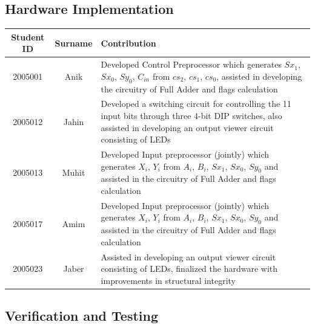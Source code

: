 \documentclass{article}
\begin{document}
\newpage

\subsection{Hardware Implementation}



\begin{table}[h]
    \centering
\begin{tabular}{|c|c|p{10cm}|}
\hline
Student ID & Surname & Contribution \\ \hline
2005001    & Anik    & Developed Control Preprocessor which generates $Sx_1$, $Sx_0$, $Sy_0$, $C_{in}$ from $cs_2$, $cs_1$, $cs_0$, assisted in developing the circuitry of Full Adder and flags calculation            \\ \hline
2005012    & Jahin   & Developed a switching circuit for controlling the 11 input bits through three 4-bit DIP switches, also assisted in developing an output viewer circuit consisting of LEDs    \\ \hline
2005013    & Muhit   &  Developed Input preprocessor (jointly) which generates $X_i$, $Y_i$ from $A_i$, $B_i$, $Sx_1$, $Sx_0$, $Sy_0$ and assisted in the circuitry of Full Adder and flags calculation   \\ \hline
2005017    & Amim    &  Developed Input preprocessor (jointly) which generates $X_i$, $Y_i$ from $A_i$, $B_i$, $Sx_1$, $Sx_0$, $Sy_0$ and assisted in the circuitry of Full Adder and flags calculation    \\ \hline
2005023    & Jaber   &  Assisted in developing an output viewer circuit consisting of LEDs, finalized the hardware with improvements in structural integrity     \\ \hline
\end{tabular}
\end{table}



\subsection{Verification and Testing}
\end{document}
